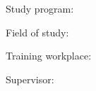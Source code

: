 
\noindent
Study program: \myStudyProgram

\noindent
Field of study: \myStudyField

\noindent
Training workplace: \myInstitude

\noindent
Supervisor: \mySupervisor

\medskip{}

\noindent
\myDate


\newpage
\thispagestyle{empty}
\mbox{}
\newpage

